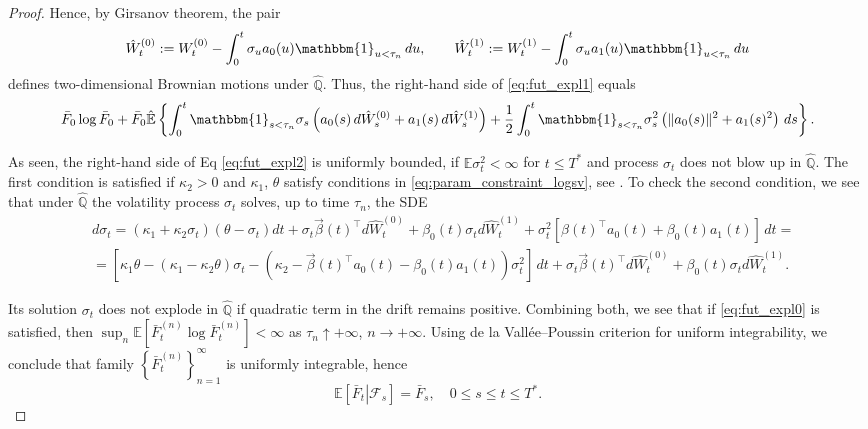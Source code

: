\documentclass[pdftex,11pt,a4paper] {article}
\begin{document}
\begin{proof}
Hence, by Girsanov theorem, the pair 
\begin{equation*}
\hat W_t^{(0)}:=W_t^{(0)}-\int_0^t\sigma_u a_0(u)\mathbbm{1}_{u<\tau_n}\,du,\qquad 
\hat W_t^{(1)}:=W_t^{(1)}-\int_0^t\sigma_u a_1(u)\mathbbm{1}_{u<\tau_n}\,du
\end{equation*}
defines two-dimensional Brownian motions under $\mathbb{\hat Q}$. Thus, the right-hand side of \eqref{eq:fut_expl1} equals
\begin{equation}\label{eq:fut_expl2}
\bar F_0\log \bar F_0 + \bar F_0\mathbb{\hat E}\left\{\int_0^t\mathbbm{1}_{s<\tau_n}\sigma_s\left(a_0(s)\,d\hat W_s^{(0)}+a_1(s)\,d\hat W_s^{(1)}\right)+\frac{1}{2}\int_0^t\mathbbm{1}_{s<\tau_n}\sigma_s^2\left(\|a_0(s)\|^2+a_1(s)^2\right)\,ds\right\}.
\end{equation}

As seen, the right-hand side of Eq \eqref{eq:fut_expl2} is uniformly bounded, if $\mathbb{E}\sigma_t^2<\infty$ for $t\le T^*$ and process $\sigma_t$ does not blow up in $\mathbb{\hat Q}$. 
The first condition is satisfied if $\kappa_2>0$ and $\kappa_1$, $\theta$ satisfy conditions in  \eqref{eq:param_constraint_logsv}, see \cite{Sepp2024}. 
To check the second condition, we see that under $\mathbb{\hat Q}$ the volatility process $\sigma_t$ solves, up to time $\tau_n$, the SDE
\begin{equation}\label{eq:fut_expl3}
\begin{split}
&d\sigma_t=\left(\kappa_{1}+\kappa_{2}\sigma_t\right)(\theta-\sigma_t)dt + \sigma_t\vec{\beta}(t)^\top d\hat W^{(0)}_t+\beta_0(t)\sigma_td\hat W^{(1)}_t+\sigma_t^2\left[\beta(t)^\top a_0(t)+\beta_0(t)a_1(t)\right]\,dt=\\
&=\left[\kappa_1\theta-(\kappa_1-\kappa_2\theta)\sigma_t-\left(\kappa_2-\vec{\beta}(t)^\top a_0(t)-\beta_0(t)a_1(t)\right)\sigma_t^2\right]\,dt+\sigma_t\vec{\beta}(t)^\top d\hat W^{(0)}_t+\beta_0(t)\sigma_td\hat W^{(1)}_t.
\end{split}
\end{equation}

Its solution $\sigma_t$ does not explode in $\hat{\mathbb{Q}}$ if quadratic term in the drift remains positive. 
Combining both, we see that if \eqref{eq:fut_expl0} is satisfied, then $\sup_n\mathbb{E}\left[\bar F_t^{(n)}\log \bar F_t^{(n)}\right]<\infty$ as  $\tau_n\uparrow +\infty$, $n\to +\infty$. 
Using  de la Vall\'{e}e--Poussin criterion for uniform integrability, we conclude that family $\left\{\bar F_t^{(n)}\right\}_{n=1}^{\infty}$ is uniformly integrable, hence
\begin{equation}
\mathbb{E}[\left.\bar F_t\right|\mathcal{F}_s]=\bar F_s,\quad 0\le s\le t\le T^*.
\end{equation}
\end{proof}
\end{document}
